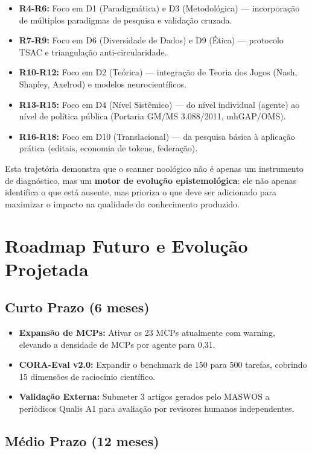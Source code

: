 \begin{itemize}
  \item \textbf{R4-R6:} Foco em D1 (Paradigmática) e D3 (Metodológica) --- incorporação de múltiplos paradigmas de pesquisa e validação cruzada.
  \item \textbf{R7-R9:} Foco em D6 (Diversidade de Dados) e D9 (Ética) --- protocolo TSAC e triangulação anti-circularidade.
  \item \textbf{R10-R12:} Foco em D2 (Teórica) --- integração de Teoria dos Jogos (Nash, Shapley, Axelrod) e modelos neurocientíficos.
  \item \textbf{R13-R15:} Foco em D4 (Nível Sistêmico) --- do nível individual (agente) ao nível de política pública (Portaria GM/MS 3.088/2011, mhGAP/OMS).
  \item \textbf{R16-R18:} Foco em D10 (Translacional) --- da pesquisa básica à aplicação prática (editais, economia de tokens, federação).
\end{itemize}

Esta trajetória demonstra que o scanner noológico não é apenas um instrumento de diagnóstico, mas um \textbf{motor de evolução epistemológica}: ele não apenas identifica o que está ausente, mas prioriza o que deve ser adicionado para maximizar o impacto na qualidade do conhecimento produzido.

\section{Roadmap Futuro e Evolução Projetada}

\subsection{Curto Prazo (6 meses)}

\begin{itemize}
  \item \textbf{Expansão de MCPs:} Ativar os 23 MCPs atualmente com warning, elevando a densidade de MCPs por agente para 0,31.
  \item \textbf{CORA-Eval v2.0:} Expandir o benchmark de 150 para 500 tarefas, cobrindo 15 dimensões de raciocínio científico.
  \item \textbf{Validação Externa:} Submeter 3 artigos gerados pelo MASWOS a periódicos Qualis A1 para avaliação por revisores humanos independentes.
\end{itemize}

\subsection{Médio Prazo (12 meses)}

